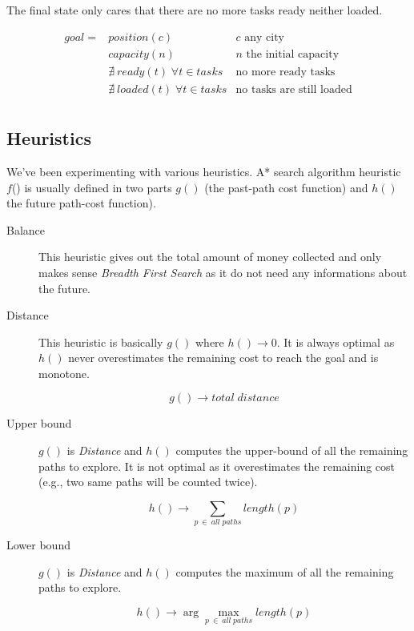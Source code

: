 \documentclass[11pt,a4paper]{article}
\begin{document}
The final state only cares that there are no more tasks ready neither loaded.

\begin{align*}
    goal = &position(c) & c \text{ any city} \\
           &capacity(n) & n \text{ the initial capacity} \\
           &\nexists \: ready(t) \; \forall t \in tasks & \text{no more ready tasks} \\
           &\nexists \: loaded(t) \; \forall t \in tasks & \text{no tasks are still loaded} \\
\end{align*}


\subsection*{Heuristics}

We've been experimenting with various heuristics. A* search algorithm heuristic
$f$() is usually defined in two parts $g()$ (the past-path cost function) and $h()$ 
the future path-cost function).

\begin{description}
    \item[Balance] This heuristic gives out the total amount of money
        collected and only makes sense \emph{Breadth First Search} as it do not
        need any informations about the future.

    \item[Distance] This heuristic is basically $g()$ where $h() \rightarrow
        0$. It is always optimal as $h()$ never overestimates the remaining
        cost to reach the goal and is monotone.

        $$g() \rightarrow total \; distance$$

    \item[Upper bound] $g()$ is \emph{Distance} and $h()$ computes the
        upper-bound of all the remaining paths to explore. It is not optimal as
        it overestimates the remaining cost (e.g., two same paths will be
        counted twice).

        $$h() \rightarrow \sum_{p \: \in \: all \; paths} length(p)$$

    \item[Lower bound] $g()$ is \emph{Distance} and $h()$ computes the maximum
        of all the remaining paths to explore.

        $$h() \rightarrow \arg\max_{p \: \in \: all \; paths} length(p)$$

\end{description}
\end{document}
